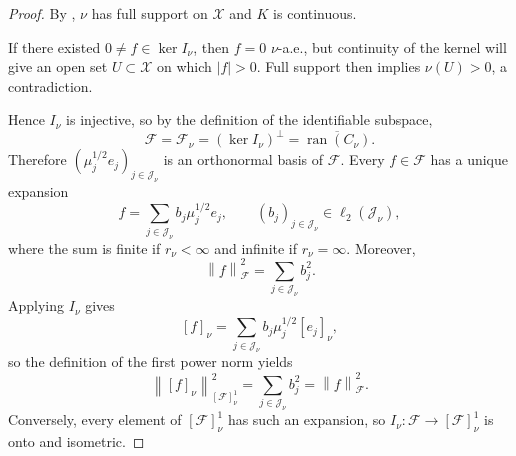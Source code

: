 \documentclass[11pt]{article}
\newcommand{\F}{\mathcal{F}}
\newcommand{\X}{\mathcal{X}}
\newcommand{\ran}{\operatorname{ran}}
\newcommand{\norm}[1]{\left\lVert #1\right\rVert}
\begin{document}
\begin{proof}
By , $\nu$ has full support on $\X$ and $K$ is continuous. 

If there existed $0\neq f\in\ker I_\nu$, then $f=0$ $\nu$-a.e., but continuity of the kernel will give an open set $U\subset\X$ on which $|f|>0$. Full support then implies $\nu(U)>0$, a contradiction.

Hence $I_\nu$ is injective, so by the definition of the identifiable subspace,
\[
  \F=\F_\nu=(\ker I_\nu)^\perp=\overline{\ran(C_\nu)}.
\]
Therefore $(\mu_j^{1/2}e_j)_{j\in\mathcal J_\nu}$ is an orthonormal basis of $\F$. Every $f\in\F$ has a unique expansion
\[
  f=\sum_{j\in\mathcal J_\nu}b_j\mu_j^{1/2}e_j,
  \qquad
  (b_j)_{j\in\mathcal J_\nu}\in\ell_2(\mathcal J_\nu),
\]
where the sum is finite if $r_\nu<\infty$ and infinite if $r_\nu=\infty$. Moreover,
\[
  \norm{f}_{\F}^2=\sum_{j\in\mathcal J_\nu}b_j^2.
\]
Applying $I_\nu$ gives
\[
  [f]_\nu
  =
  \sum_{j\in\mathcal J_\nu}b_j\mu_j^{1/2}[e_j]_\nu,
\]
so the definition of the first power norm yields
\[
  \norm{[f]_\nu}_{[\F]^1_\nu}^2
  =
  \sum_{j\in\mathcal J_\nu}b_j^2
  =
  \norm{f}_{\F}^2.
\]
Conversely, every element of $[\F]^1_\nu$ has such an expansion, so $I_\nu:\F\to[\F]^1_\nu$ is onto and isometric.
\end{proof}
\end{document}

